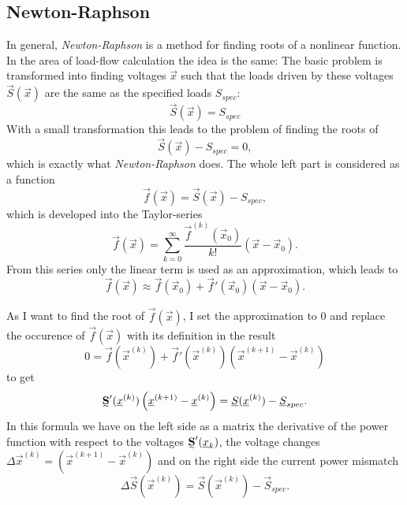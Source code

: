 \subsection{Newton-Raphson}
\label{sec:newton_raphson}

In general, \emph{Newton-Raphson} is a method for finding roots of a nonlinear function. In the area of load-flow calculation the idea is the same: The basic problem is transformed into finding voltages $\vec x$ such that the loads driven by these voltages $\vec S (\vec x)$ are the same as the specified loads $S_{spec}$:
\begin{equation}
	\vec S (\vec x) = S_{spec}
\end{equation}
With a small transformation this leads to the problem of finding the roots of
\begin{equation}
	\vec S (\vec x) - S_{spec} = 0,
\end{equation}
which is exactly what \emph{Newton-Raphson} does. The whole left part is considered as a function
\begin{equation}
	\vec f (\vec x) = \vec S (\vec x) - S_{spec},
\end{equation}
which is developed into the Taylor-series
\begin{equation}
	\vec f (\vec x) = \sum_{k = 0}^\infty \frac{\vec f^{(k)} (\vec x_0)}{k!} \left( \vec x - \vec x_0 \right).
\end{equation}
From this series only the linear term is used as an approximation, which leads to
\begin{equation}
	\vec f (\vec x) \approx \vec f (\vec x_0) + \vec f' (\vec x_0) \left( \vec x - \vec x_0 \right).
\end{equation}

As I want to find the root of $\vec f (\vec x)$, I set the approximation to 0 and replace the occurence of $\vec f (\vec x)$ with its definition in the result
\begin{equation}
	0 = \vec f (\vec x^{(k)}) + \vec f' (\vec x^{(k)}) \left( \vec x^{(k+1)} - \vec x^{(k)} \right)
\end{equation}
to get
\begin{equation}
	\mat S' (\vec x^{(k)}) \left( \vec x^{(k+1)} - \vec x^{(k)} \right) = \vec S (\vec x^{(k)}) - \vec S_{spec}.
	\label{eq:newton_raphson_equation_system}
\end{equation}
In this formula we have on the left side as a matrix the derivative of the power function with respect to the voltages $\mat S' (\vec x_k)$, the voltage changes $\Delta \vec x^{(k)} = \left( \vec x^{(k+1)} - \vec x^{(k)} \right)$ and on the right side the current power mismatch 
\begin{equation}
	\Delta \vec S (\vec x^{(k)}) = \vec S (\vec x^{(k)}) - \vec S_{spec}.
	\label{eq:power_mismatch}
\end{equation}


